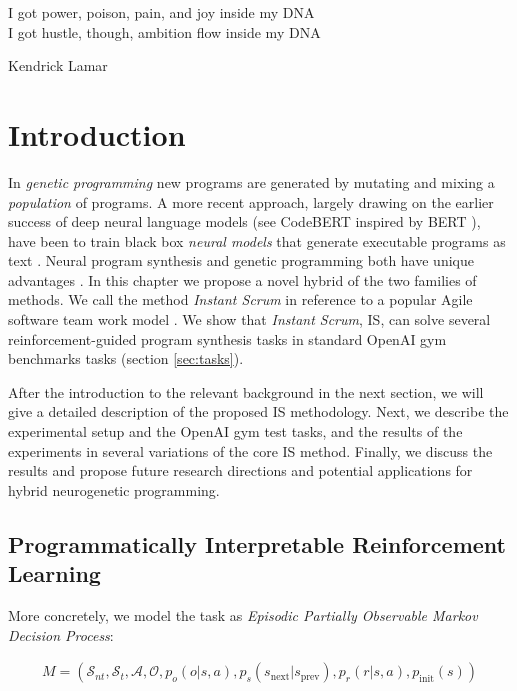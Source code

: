 \epigraph{I got power, poison, pain, and joy inside my DNA \\ I got hustle, though, ambition flow inside my DNA}{Kendrick Lamar}


\section{Introduction}\label{sec:intro}


In \emph{genetic programming} \cite{genprog1,genprog2} new programs are generated by mutating and mixing a \emph{population} of programs. 
 A more recent approach, largely drawing on the earlier success of deep neural language models (see CodeBERT \cite{codebert} inspired by BERT \cite{devlinBERTPretrainingDeep2019}), have been to train black box \emph{neural models} that generate executable programs as text \cite{abolafiaNeuralProgramSynthesis2018,deepcoder,structural}. 
 Neural program synthesis and genetic programming both have unique advantages \cite{geneticvsneural}. 
 In this chapter we propose a novel hybrid of the two families of methods. We call the method \emph{Instant Scrum} in reference to a popular Agile software team work model \cite{scrum}. We show that \emph{Instant Scrum}, IS, can solve several reinforcement-guided program synthesis tasks in standard OpenAI gym benchmarks tasks (section \ref{sec:tasks}). 

After the introduction to the relevant background in the next section, we will give a detailed description of the proposed IS methodology. Next, we describe the experimental setup and the OpenAI gym test tasks, and the results of the experiments in several variations of the core IS method. Finally, we discuss the results and propose future research directions and potential applications for hybrid neurogenetic programming. 

\newpage \subsection{Programmatically Interpretable Reinforcement Learning}
\label{sec:pirl}

More concretely, we model the task as {\em Episodic Partially Observable Markov Decision Process}:

\begin{multline}
M = (\mathcal{S}_{nt}, \mathcal{S}_t, \mathcal{A}, \mathcal{O}, p_o(o | s, a), p_s(s_\text{next} | s_\text{prev}), p_r(r | s, a), p_\text{init}(s))
\end{multline}

